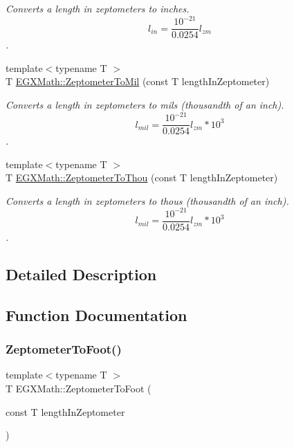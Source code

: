 \begin{DoxyCompactItemize}
\begin{DoxyCompactList}\small\item\em Converts a length in zeptometers to inches. \[ l_{in}= \frac{10^{-21}}{0.0254} l_{zm} \]. \end{DoxyCompactList}\item 
{\footnotesize template$<$typename T $>$ }\\T \mbox{\hyperlink{group___e_g_x_math-_conversions-_length_conversions-_zeptometer-_imperial_ga68abfac4247069bdffc24002b0636495}{E\+G\+X\+Math\+::\+Zeptometer\+To\+Mil}} (const T length\+In\+Zeptometer)
\begin{DoxyCompactList}\small\item\em Converts a length in zeptometers to mils (thousandth of an inch). \[ l_{mil}= \frac{10^{-21}}{0.0254} l_{zm} * 10^{3} \]. \end{DoxyCompactList}\item 
{\footnotesize template$<$typename T $>$ }\\T \mbox{\hyperlink{group___e_g_x_math-_conversions-_length_conversions-_zeptometer-_imperial_ga14432ed712e073dcae040496f83464b6}{E\+G\+X\+Math\+::\+Zeptometer\+To\+Thou}} (const T length\+In\+Zeptometer)
\begin{DoxyCompactList}\small\item\em Converts a length in zeptometers to thous (thousandth of an inch). \[ l_{mil}= \frac{10^{-21}}{0.0254} l_{zm} * 10^{3} \]. \end{DoxyCompactList}\end{DoxyCompactItemize}


\subsection{Detailed Description}


\subsection{Function Documentation}
\mbox{\label{group___e_g_x_math-_conversions-_length_conversions-_zeptometer-_imperial_ga2567dcbdc1b08aa9c9e99082ad9fe92b}} 
\subsubsection{\texorpdfstring{Zeptometer\+To\+Foot()}{ZeptometerToFoot()}}
{\footnotesize\ttfamily template$<$typename T $>$ \\
T E\+G\+X\+Math\+::\+Zeptometer\+To\+Foot (\begin{DoxyParamCaption}\item[{const T}]{length\+In\+Zeptometer }\end{DoxyParamCaption})}



